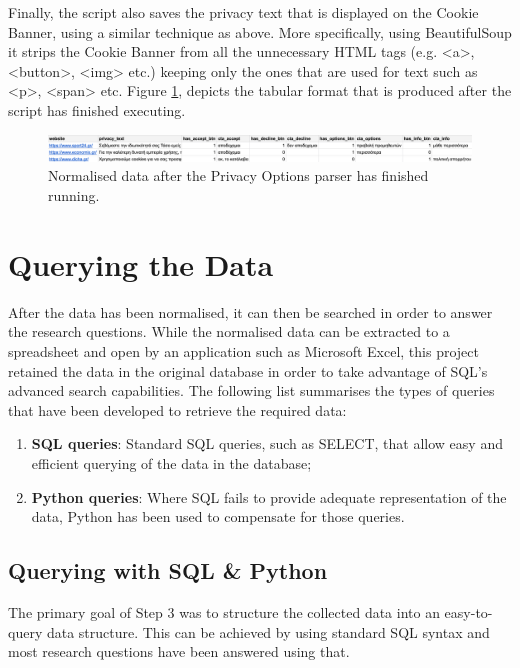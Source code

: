 \documentclass[../main.tex]{subfiles}
\begin{document}
Finally, the script also saves the privacy text that is displayed on the Cookie Banner, using a similar technique as above. More specifically, using BeautifulSoup it strips the Cookie Banner from all the unnecessary HTML tags (e.g. {\selectfont <a>}, {\selectfont <button>}, {\selectfont <img>} etc.) keeping only the ones that are used for text such as {\selectfont <p>}, {\selectfont <span>} etc. Figure \ref{fig:impl_privacy_options_normalised}, depicts the tabular format that is produced after the script has finished executing. 

\begin{figure}[ht]
    \centering
    \includegraphics[width=\textwidth]{images/implementation/normalised_data.png}
    \caption{Normalised data after the Privacy Options parser has finished running.}
    \label{fig:impl_privacy_options_normalised}
\end{figure}

\section{Querying the Data}
After the data has been normalised, it can then be searched in order to answer the research questions. While the normalised data can be extracted to a spreadsheet and open by an application such as Microsoft Excel, this project retained the data in the original database in order to take advantage of SQL’s advanced search capabilities. The following list summarises the types of queries that have been developed to retrieve the required data: 

\begin{enumerate}
    \item \textbf{SQL queries}: Standard SQL queries, such as SELECT, that allow easy and efficient querying of the data in the database;
    
    \item \textbf{Python queries}: Where SQL fails to provide adequate representation of the data, Python has been used to compensate for those queries.
\end{enumerate}

\subsection{Querying with SQL \& Python}
The primary goal of Step 3 was to structure the collected data into an easy-to-query data structure. This can be achieved by using standard SQL syntax \cite{bowman1996practical} and most research questions have been answered using that. 
\end{document}
